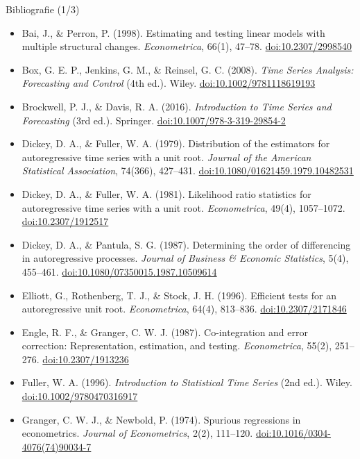 \begin{frame}{Bibliografie (1/3)}
\itemsize{\scriptsize}
\begin{itemize}
    \item Bai, J., \& Perron, P. (1998). Estimating and testing linear models with multiple structural changes. \textit{Econometrica}, 66(1), 47--78. \href{https://doi.org/10.2307/2998540}{doi:10.2307/2998540}
    \item Box, G. E. P., Jenkins, G. M., \& Reinsel, G. C. (2008). \textit{Time Series Analysis: Forecasting and Control} (4th ed.). Wiley. \href{https://doi.org/10.1002/9781118619193}{doi:10.1002/9781118619193}
    \item Brockwell, P. J., \& Davis, R. A. (2016). \textit{Introduction to Time Series and Forecasting} (3rd ed.). Springer. \href{https://doi.org/10.1007/978-3-319-29854-2}{doi:10.1007/978-3-319-29854-2}
    \item Dickey, D. A., \& Fuller, W. A. (1979). Distribution of the estimators for autoregressive time series with a unit root. \textit{Journal of the American Statistical Association}, 74(366), 427--431. \href{https://doi.org/10.1080/01621459.1979.10482531}{doi:10.1080/01621459.1979.10482531}
    \item Dickey, D. A., \& Fuller, W. A. (1981). Likelihood ratio statistics for autoregressive time series with a unit root. \textit{Econometrica}, 49(4), 1057--1072. \href{https://doi.org/10.2307/1912517}{doi:10.2307/1912517}
    \item Dickey, D. A., \& Pantula, S. G. (1987). Determining the order of differencing in autoregressive processes. \textit{Journal of Business \& Economic Statistics}, 5(4), 455--461. \href{https://doi.org/10.1080/07350015.1987.10509614}{doi:10.1080/07350015.1987.10509614}
    \item Elliott, G., Rothenberg, T. J., \& Stock, J. H. (1996). Efficient tests for an autoregressive unit root. \textit{Econometrica}, 64(4), 813--836. \href{https://doi.org/10.2307/2171846}{doi:10.2307/2171846}
    \item Engle, R. F., \& Granger, C. W. J. (1987). Co-integration and error correction: Representation, estimation, and testing. \textit{Econometrica}, 55(2), 251--276. \href{https://doi.org/10.2307/1913236}{doi:10.2307/1913236}
    \item Fuller, W. A. (1996). \textit{Introduction to Statistical Time Series} (2nd ed.). Wiley. \href{https://doi.org/10.1002/9780470316917}{doi:10.1002/9780470316917}
    \item Granger, C. W. J., \& Newbold, P. (1974). Spurious regressions in econometrics. \textit{Journal of Econometrics}, 2(2), 111--120. \href{https://doi.org/10.1016/0304-4076(74)90034-7}{doi:10.1016/0304-4076(74)90034-7}
\end{itemize}
\end{frame}

